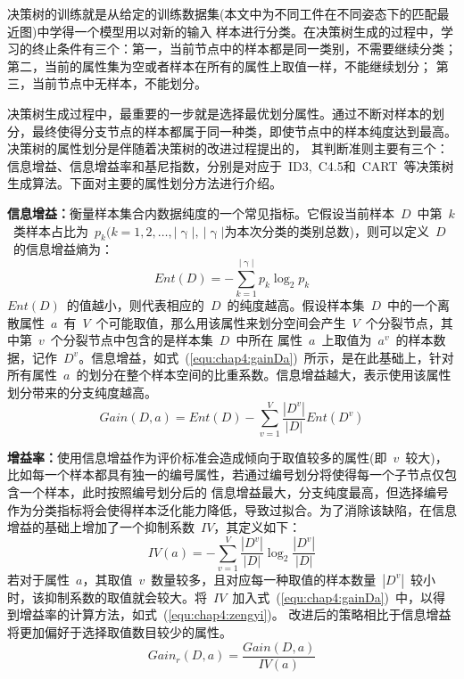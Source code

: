 决策树的训练就是从给定的训练数据集(本文中为不同工件在不同姿态下的匹配最近图)中学得一个模型用以对新的输入
样本进行分类。在决策树生成的过程中，学习的终止条件有三个：第一，当前节点中的样本都是同一类别，不需要继续分类；第二，当前的属性集为空或者样本在所有的属性上取值一样，不能继续划分；
第三，当前节点中无样本，不能划分。

决策树生成过程中，最重要的一步就是选择最优划分属性。通过不断对样本的划分，最终使得分支节点的样本都属于同一种类，即使节点中的样本纯度达到最高。决策树的属性划分是伴随着决策树的改进过程提出的，
其判断准则主要有三个：信息增益、信息增益率和基尼指数，分别是对应于~ID3,~C4.5和~CART~等决策树生成算法。下面对主要的属性划分方法进行介绍。

\noindent\textbf{信息增益：}衡量样本集合内数据纯度的一个常见指标。它假设当前样本~$D$~中第~$k$~类样本占比为~$p_k(k=1,2,\dotsc ,|\upgamma|,~|\upgamma|$为本次分类的类别总数)，则可以定义~$D$~的信息增益熵为：
\begin{equation}
  \label{equ:chap4:ent}
  Ent(D)=-\sum_{k=1}^{|\upgamma |} p_k \log_2 p_k
\end{equation}
$Ent(D)$~的值越小，则代表相应的~$D$~的纯度越高。假设样本集~$D$~中的一个离散属性~$a$~有~$V$~个可能取值，那么用该属性来划分空间会产生~$V$~个分裂节点，其中第~$v$~个分裂节点中包含的是样本集~$D$~中所在
属性~$a$~上取值为~$a^v$~的样本数据，记作~$D^v$。信息增益，如式~(\ref{equ:chap4:gainDa})~所示，是在此基础上，针对所有属性~$a$~的划分在整个样本空间的比重系数。信息增益越大，表示使用该属性划分带来的分支纯度越高。
\begin{equation}
  \label{equ:chap4:gainDa}
  Gain(D,a)=Ent(D)-\sum _{v=1}^V \frac{|D^v|}{|D|}Ent(D^v)
\end{equation}

\noindent\textbf{增益率：}使用信息增益作为评价标准会造成倾向于取值较多的属性(即~$v$~较大)，比如每一个样本都具有独一的编号属性，若通过编号划分将使得每一个子节点仅包含一个样本，此时按照编号划分后的
信息增益最大，分支纯度最高，但选择编号作为分类指标将会使得样本泛化能力降低，导致过拟合。为了消除该缺陷，在信息增益的基础上增加了一个抑制系数~$IV$，其定义如下：
\begin{equation}
  \label{equ:chap4:IVa}
  IV(a)=-\sum_{v=1}^V \frac{|D^v|}{|D|}\log_2 \frac{|D^v|}{|D|}
\end{equation}
若对于属性~$a$，其取值~$v$~数量较多，且对应每一种取值的样本数量~$|D^v|$~较小时，该抑制系数的取值就会较大。将~$IV$~加入式~(\ref{equ:chap4:gainDa})~中，以得到增益率的计算方法，如式~(\ref{equ:chap4:zengyi})。
改进后的策略相比于信息增益将更加偏好于选择取值数目较少的属性。
\begin{equation}
  \label{equ:chap4:zengyi}
  Gain_r (D,a)=\frac{Gain(D,a)}{IV(a)}
\end{equation}


